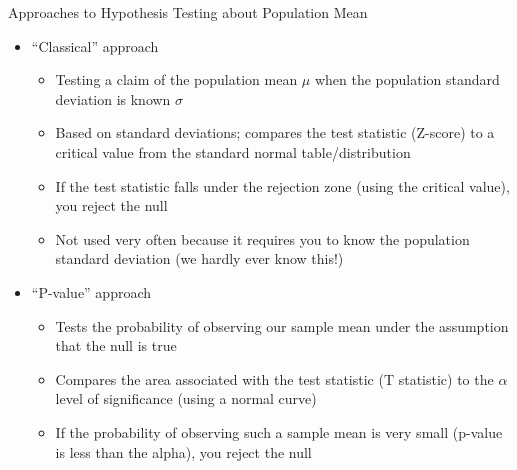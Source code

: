 \documentclass[
  8pt,
  ignorenonframetext,
  dvipsnames]{beamer}
\providecommand{\tightlist}{%
  \setlength{\itemsep}{0pt}\setlength{\parskip}{0pt}}
\let\olditem\item
\renewcommand{\item}{%
  \olditem\vspace{4pt}
}
\begin{document}
\begin{frame}{Approaches to Hypothesis Testing about Population Mean}
\protect\hypertarget{approaches-to-hypothesis-testing-about-population-mean}{}

\begin{itemize}
\tightlist
\item
  ``Classical'' approach

  \begin{itemize}
  \tightlist
  \item
    Testing a claim of the population mean \(\mu\) when the population
    standard deviation is known \(\sigma\)
  \item
    Based on standard deviations; compares the test statistic (Z-score)
    to a critical value from the standard normal table/distribution
  \item
    If the test statistic falls under the rejection zone (using the
    critical value), you reject the null
  \item
    Not used very often because it requires you to know the population
    standard deviation (we hardly ever know this!)
  \end{itemize}
\end{itemize}

\medskip

\begin{itemize}
\tightlist
\item
  ``P-value'' approach

  \begin{itemize}
  \tightlist
  \item
    Tests the probability of observing our sample mean under the
    assumption that the null is true
  \item
    Compares the area associated with the test statistic (T statistic)
    to the \(\alpha\) level of significance (using a normal curve)
  \item
    If the probability of observing such a sample mean is very small
    (p-value is less than the alpha), you reject the null
  \end{itemize}
\end{itemize}

\end{frame}
\end{document}
